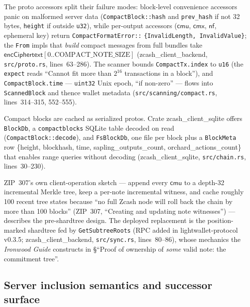 \documentclass[11pt,a4paper]{article}
\theoremstyle{definition}
\newcommand{\nfsym}{\mathsf{nf}}
\newcommand{\cmx}{\mathsf{cmx}}
\begin{document}
The proto accessors split their failure modes: block-level convenience
accessors panic on malformed server data (\texttt{CompactBlock::hash} and
\texttt{prev\_hash} if not 32 bytes, \texttt{height} if outside
\texttt{u32}), while per-output accessors ($\mathsf{cmu}$, $\cmx$,
$\nfsym$, ephemeral key) return
\texttt{CompactFormatError::}\allowbreak%
\texttt{\{InvalidLength, InvalidValue\}}; the
\texttt{From} impls that \emph{build} compact messages from full bundles
take $\mathsf{encCiphertext}[0..\mathrm{COMPACT\_NOTE\_SIZE}]$
(\textsf{zcash\_client\_backend}, \texttt{src/proto.rs}, lines~63--286).
The scanner bounds \texttt{CompactTx.index} to \texttt{u16} (the
\texttt{expect} reads ``Cannot fit more than $2^{16}$ transactions in a
block''), and \texttt{CompactBlock.time} --- \texttt{uint32} Unix epoch,
``if non-zero'' --- flows into \texttt{ScannedBlock} and thence wallet
metadata (\texttt{src/scanning/compact.rs}, lines~314--315, 552--555).

Compact blocks are cached as serialized protos. Crate
\textsf{zcash\_client\_sqlite} offers \texttt{BlockDb}, a
\texttt{compactblocks} SQLite table decoded on read
(\texttt{CompactBlock::decode}), and \texttt{FsBlockDb}, one file per block
plus a \texttt{BlockMeta} row \{height, blockhash, time,
sapling\_outputs\_count, orchard\_actions\_count\} that enables range
queries without decoding (\textsf{zcash\_client\_sqlite},
\texttt{src/chain.rs}, lines~30--230).

ZIP~307's own client-operation sketch --- append every $\mathsf{cmu}$ to a
depth-32 incremental Merkle tree, keep a per-note incremental witness, and
cache roughly 100 recent tree states because ``no full Zcash node will roll
back the chain by more than 100 blocks'' (ZIP~307, ``Creating and updating
note witnesses'') --- describes the pre-shardtree design. The deployed
replacement is the position-marked shardtree fed by \texttt{GetSubtreeRoots}
(RPC added in \textsf{lightwallet-protocol} v0.3.5;
\textsf{zcash\_client\_backend}, \texttt{src/sync.rs}, lines~80--86), whose
mechanics the \emph{Ironwood Guide} constructs in \S``Proof of ownership of
\emph{some} valid note: the commitment tree''.

\subsection{Server inclusion semantics and successor surface}%
\label{sec:sync-compact-servers}
\end{document}
